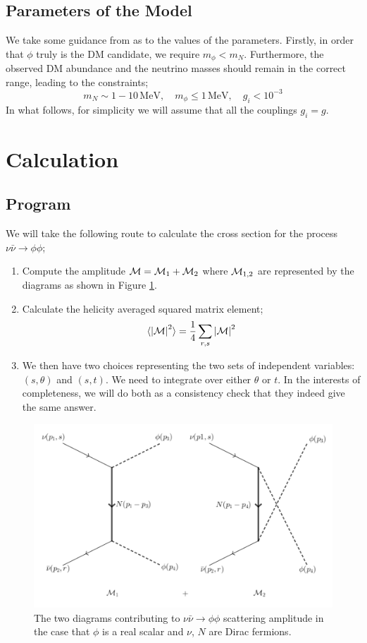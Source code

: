 \documentclass[10pt]{article}
\begin{document}
\subsection{Parameters of the Model}
We take some guidance from \cite{Farzan2014} as to the values of the parameters. Firstly, in order that $\phi$ truly is the DM candidate, we require $m_{\phi} < m_N$. Furthermore, the observed DM abundance and the neutrino masses should remain in the correct range, leading to the constraints;\footnotemark
{}
\begin{equation}
m_N \sim 1 - 10 \, \text{MeV}, \quad m_{\phi} \leq 1 \, \text{MeV}, \quad g_i < 10^{-3}
\end{equation}
In what follows, for simplicity we will assume that all the couplings $g_i = g$.
\section{Calculation}
\subsection{Program}
We will take the following route to calculate the cross section for the process $\nu \bar{\nu} \rightarrow \phi \phi$;
\begin{enumerate}
\item Compute the amplitude $\mathcal{M} = \mathcal{M}_1 + \mathcal{M}_2$ where $\mathcal{M}_{1,2}$ are represented by the diagrams as shown in Figure \ref{fig:feyn}.
\item Calculate the helicity averaged squared matrix element;
\begin{equation}
\langle \left|\mathcal{M}\right|^2\rangle = \frac{1}{4}\sum_{r,s}{\left|\mathcal{M}\right|^2}
\end{equation}
\item We then have two choices representing the two sets of independent variables: $(s, \theta)$ and $(s,t)$. We need to integrate over either $\theta$ or $t$. In the interests of completeness, we will do both as a consistency check that they indeed give the same answer.
\end{enumerate}
\begin{figure}[h]
\begin{framed}
\centering
\includegraphics[width=0.6\linewidth]{feyndiag}
\caption{The two diagrams contributing to $\nu \bar{\nu} \rightarrow \phi \phi$ scattering amplitude in the case that $\phi$ is a real scalar and $\nu$, $N$ are Dirac fermions.}
\label{fig:feyn}
\end{framed}
\end{figure}
\end{document}
